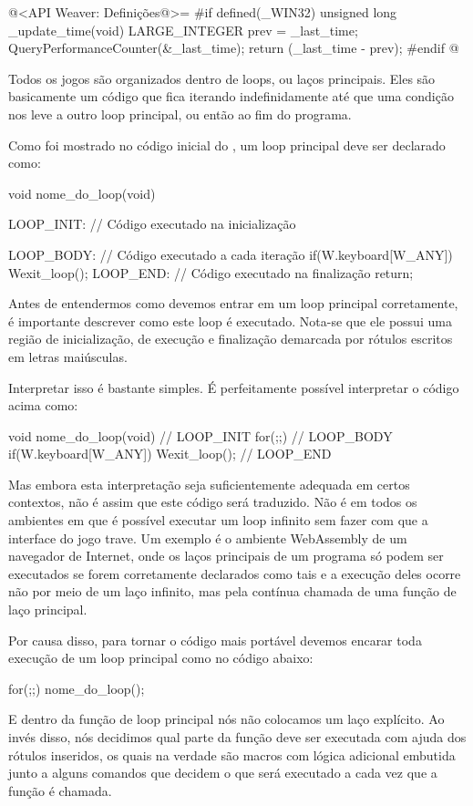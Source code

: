 \iniciocodigo
@<API Weaver: Definições@>=
#if defined(_WIN32)
unsigned long _update_time(void){
  LARGE_INTEGER prev = _last_time;
  QueryPerformanceCounter(&_last_time);
  return (_last_time - prev);
}
#endif
@
\fimcodigo


Todos os jogos são organizados dentro de loops, ou laços
principais. Eles são basicamente um código que fica iterando
indefinidamente até que uma condição nos leve a outro loop principal,
ou então ao fim do programa.

Como foi mostrado no código inicial do , um loop
principal deve ser declarado como:

\alinhaverbatim
void nome\_do\_loop(void){
 LOOP\_INIT: // Código executado na inicialização

 LOOP\_BODY: // Código executado a cada iteração
    if(W.keyboard[W\_ANY])
        Wexit\_loop();
 LOOP\_END: // Código executado na finalização
    return;
}
\alinhanormal

Antes de entendermos como devemos entrar em um loop principal
corretamente, é importante descrever como este loop é
executado. Nota-se que ele possui uma região de inicialização, de
execução e finalização demarcada por rótulos escritos em letras
maiúsculas.

Interpretar isso é bastante simples. É perfeitamente possível
interpretar o código acima como:

\alinhaverbatim
void nome\_do\_loop(void){
  // LOOP\_INIT
  for(;;){
    // LOOP\_BODY
    if(W.keyboard[W\_ANY])
        Wexit\_loop();
  }
  // LOOP\_END
}
\alinhanormal

Mas embora esta interpretação seja suficientemente adequada em certos
contextos, não é assim que este código será traduzido. Não é em todos
os ambientes em que é possível executar um loop infinito sem fazer com
que a interface do jogo trave. Um exemplo é o ambiente WebAssembly de
um navegador de Internet, onde os laços principais de um programa só
podem ser executados se forem corretamente declarados como tais e a
execução deles ocorre não por meio de um laço infinito, mas pela
contínua chamada de uma função de laço principal.

Por causa disso, para tornar o código mais portável devemos encarar
toda execução de um loop principal como no código abaixo:

\alinhaverbatim
for(;;)
  nome\_do\_loop();
\alinhanormal

E dentro da função de loop principal nós não colocamos um laço
explícito. Ao invés disso, nós decidimos qual parte da função deve ser
executada com ajuda dos rótulos inseridos, os quais na verdade são
macros com lógica adicional embutida junto a alguns
comandos  que decidem o que será executado a cada vez
que a função é chamada.

